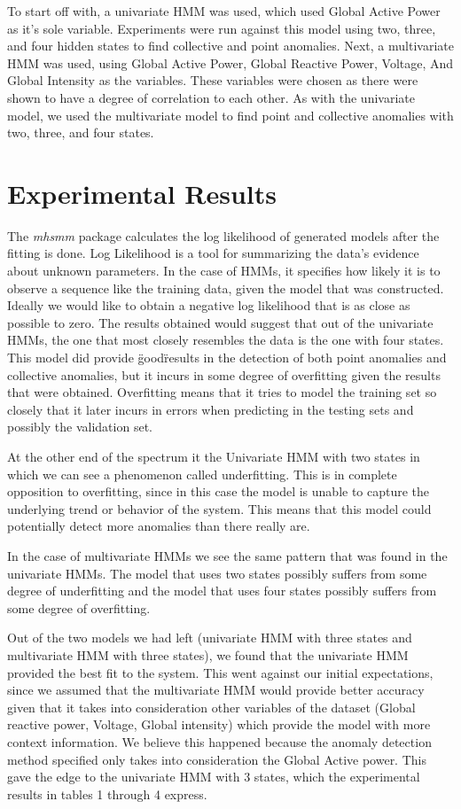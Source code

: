 \documentclass[letterpaper, 11pt]{article}%
\begin{document}
To start off with, a univariate HMM was used, which used Global Active Power as it's sole variable. Experiments were run against this model using two, three, and four hidden states to find collective and point anomalies. Next, a multivariate HMM was used, using Global Active Power, Global Reactive Power, Voltage, And Global Intensity as the variables. These variables were chosen as there were shown to have a degree of correlation to each other. As with the univariate model, we used the multivariate model to find point and collective anomalies with two, three, and four states.

\section{Experimental Results}
The \textit{mhsmm} package calculates the log likelihood of generated models after the fitting is done. Log Likelihood is a tool for summarizing the data's evidence about unknown parameters\cite{log}. In the case of HMMs, it specifies how likely it is to observe a sequence like the training data, given the model that was constructed. Ideally we would like to obtain a negative log likelihood that is as close as possible to zero. The results obtained would suggest that out of the univariate HMMs, the one that most closely resembles the data is the one with four states. This model did provide \"good\" results in the detection of both point anomalies and collective anomalies, but it incurs in some degree of overfitting given the results that were obtained. Overfitting means that it tries to model the training set so closely that it later incurs in errors when predicting in the testing sets and possibly the validation set. 

At the other end of the spectrum it the Univariate HMM with two states in which we can see a phenomenon called underfitting. This is in complete opposition to overfitting, since in this case the model is unable to capture the underlying trend or behavior of the system. This means that this model could potentially detect more anomalies than there really are.

In the case of multivariate HMMs we see the same pattern that was found in the univariate HMMs. The model that uses two states possibly suffers from some degree of underfitting and the model that uses four states possibly suffers from some degree of overfitting.

Out of the two models we had left (univariate HMM with three states and multivariate HMM with three states), we found that the univariate HMM provided the best fit to the system. This went against our initial expectations, since we assumed that the multivariate HMM would provide better accuracy given that it takes into consideration other variables of the dataset (Global reactive power, Voltage, Global intensity) which provide the model with more context information. We believe this happened because the anomaly detection method specified only takes into consideration the Global Active power. This gave the edge to the univariate HMM with 3 states, which the experimental results in tables 1 through 4 express.
\end{document}
